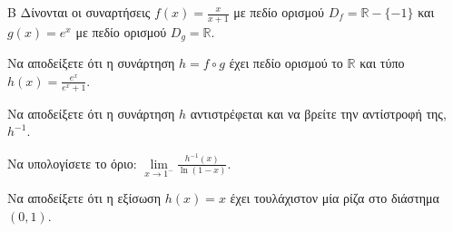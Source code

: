 \begin{thema}{Β}
Δίνονται οι συναρτήσεις $f(x) = \frac{x}{x+1}$ με πεδίο ορισμού $D_f = \mathbb{R} - \{-1\}$ και $g(x) = e^x$ με πεδίο ορισμού $D_g = \mathbb{R}$.
\begin{erwthma}
\item Να αποδείξετε ότι η συνάρτηση $h = f \circ g$ έχει πεδίο ορισμού το $\mathbb{R}$ και τύπο $h(x) = \frac{e^x}{e^x+1}$.
\item Να αποδείξετε ότι η συνάρτηση $h$ αντιστρέφεται και να βρείτε την αντίστροφή της, $h^{-1}$.
\item Να υπολογίσετε το όριο: $\lim\limits_{x \to 1^-} \frac{h^{-1}(x)}{\ln(1-x)}$.
\item Να αποδείξετε ότι η εξίσωση $h(x) = x$ έχει τουλάχιστον μία ρίζα στο διάστημα $(0, 1)$.
\end{erwthma}
\end{thema}
